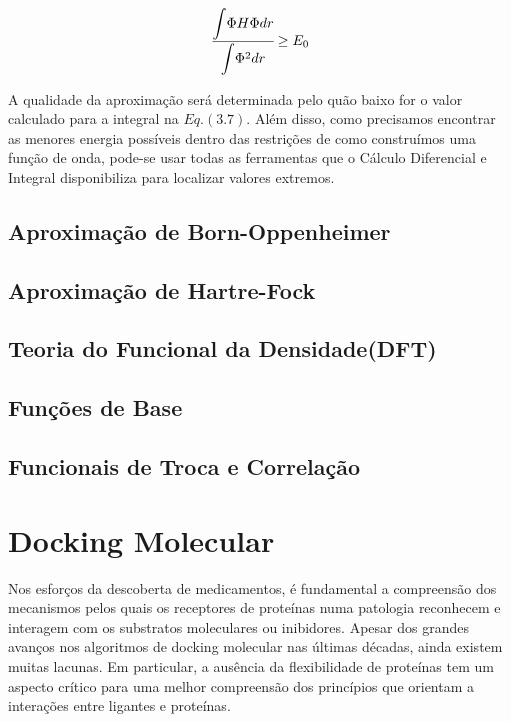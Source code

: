 \begin{equation}
     \cfrac{\mathlarger{\int} {\Phi H \Phi dr}}{\mathlarger{\int}{\Phi^2 dr}} \geq E_0
\end{equation}

A qualidade da aproximação será determinada pelo quão baixo for o valor calculado para a integral na $Eq. (3.7)$. Além disso, como precisamos encontrar as menores energia possíveis dentro das restrições de como construímos uma função de onda, pode-se usar todas as ferramentas que o Cálculo Diferencial e Integral disponibiliza para localizar valores extremos. \cite{Cramer2004}

\subsection{Aproximação de Born-Oppenheimer}



\subsection{Aproximação de Hartre-Fock}

\subsection{Teoria do Funcional da Densidade(DFT)}

\subsection{Funções de Base}

\subsection{Funcionais de Troca e Correlação}

\section{Docking Molecular}

Nos esforços da descoberta de medicamentos, é fundamental a compreensão dos mecanismos pelos quais os receptores de proteínas numa patologia reconhecem e interagem com os substratos moleculares ou inibidores. Apesar dos grandes avanços nos algoritmos de docking molecular nas últimas décadas, ainda existem muitas lacunas. Em particular, a ausência da flexibilidade de proteínas tem um aspecto crítico para uma melhor compreensão dos princípios que orientam a interações entre ligantes e proteínas. \cite{Souza2006}

